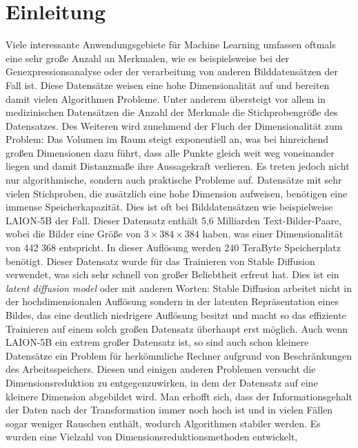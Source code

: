 \chapter{Einleitung}
\label{ch:Enleitung}

Viele interessante Anwendungsgebiete für Machine Learning umfassen oftmals eine sehr große Anzahl
an Merkmalen, wie es beispielsweise bei der Genexpressionsanalyse oder der verarbeitung von anderen
Bilddatensätzen der Fall ist. Diese Datensätze weisen eine hohe Dimensionalität auf und bereiten
damit vielen Algorithmen Probleme. Unter anderem übersteigt vor allem in medizinischen Datensätzen
die Anzahl der Merkmale die Stichprobengröße des Datensatzes. Des Weiteren wird zunehmend der Fluch
der Dimensionalität zum Problem: Das Volumen im Raum steigt exponentiell an, was bei hinreichend
großen Dimensionen dazu führt, dass alle Punkte gleich weit weg voneinander liegen und damit
Distanzmaße ihre Aussagekraft verlieren. Es treten jedoch nicht nur algorithmische, sondern auch
praktische Probleme auf. Datensätze mit sehr vielen Stichproben, die zusätzlich eine hohe Dimension
aufweisen, benötigen eine immense Speicherkapazität. Dies ist oft bei Bilddatensätzen wie
beispielweise LAION-5B der Fall. Dieser Datensatz enthält 5,6 Milliarden Text-Bilder-Paare, wobei
die Bilder eine Größe von $3 \times 384 \times 384$ haben, was einer Dimensionalität von 442 368
entspricht. In dieser Auflösung werden 240 TeraByte Speicherplatz benötigt. Dieser Datensatz wurde
für das Trainieren von Stable Diffusion \addref verwendet, was sich sehr schnell von großer
Beliebtheit erfreut hat. Dies ist ein \textit{latent diffusion model} oder mit anderen Worten:
Stable Diffusion arbeitet nicht in der hochdimensionalen Auflösung sondern in der latenten
Repräsentation eines Bildes, das eine deutlich niedrigere Auflösung besitzt und macht so das
effiziente Trainieren auf einem solch großen Datensatz überhaupt erst möglich. Auch wenn LAION-5B
ein extrem großer Datensatz ist, so sind auch schon kleinere Datensätze ein Problem für
herkömmliche Rechner aufgrund von Beschränkungen des Arbeitsspeichers. Diesen und einigen anderen
Problemen versucht die Dimensionsreduktion zu entgegenzuwirken, in dem der Datensatz auf eine
kleinere Dimension abgebildet wird. Man erhofft sich, dass der Informationsgehalt der Daten nach
der Transformation immer noch hoch ist und in vielen Fällen sogar weniger Rauschen enthält, wodurch
Algorithmen stabiler werden. Es wurden eine Vielzahl von Dimensionsreduktionsmethoden entwickelt,

